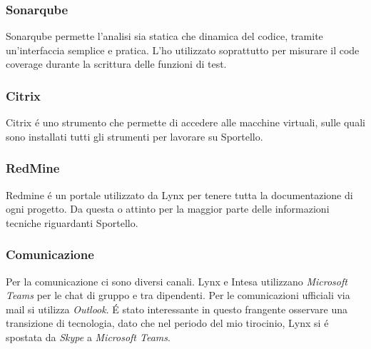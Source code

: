 \subsubsection{Sonarqube}
Sonarqube permette l'analisi sia statica che dinamica del codice, tramite un'interfaccia semplice e pratica. L'ho utilizzato soprattutto per misurare il code coverage durante la scrittura delle funzioni di test. 

\subsubsection{Citrix}
Citrix é uno strumento che permette di accedere alle macchine virtuali, sulle quali sono installati tutti gli strumenti per lavorare su Sportello. 

\subsubsection{RedMine}
Redmine é un portale utilizzato da Lynx per tenere tutta la documentazione di ogni progetto. Da questa o attinto per la maggior parte delle informazioni tecniche riguardanti Sportello.

\subsubsection{Comunicazione}
Per la comunicazione ci sono diversi canali. Lynx e Intesa utilizzano \textit{Microsoft Teams} per le chat di gruppo e tra dipendenti. Per le comunicazioni ufficiali via mail si utilizza \textit{Outlook}. É stato interessante in questo frangente osservare una transizione di tecnologia, dato che nel periodo del mio tirocinio, Lynx si é spostata da \textit{Skype} a \textit{Microsoft Teams}.
